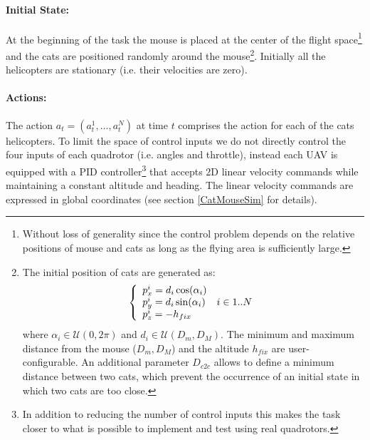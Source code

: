 \documentclass[a4paper,11pt]{report}
\begin{document}
\paragraph{Initial State:} At the beginning of the task the mouse is placed at the center of the flight space\footnote{Without loss of generality since the control problem depends on the relative positions of mouse and cats as long as the flying area is sufficiently large.} and the cats are positioned randomly around the mouse\footnote{
The initial position of cats are generated as:
$$
\left\{
\begin{array}{l l}
p^i_x =  d_i \cos(\alpha_i) & \\
p^i_y =  d_i \sin(\alpha_i) & i \in 1..N\\
p^i_z = - h_{fix} & \\
\end{array}
\right.
$$
where $\alpha_i \in \mathcal{U}(0,2\pi)$ and $d_i \in \mathcal{U}(D_m,D_M)$. The minimum and maximum distance from the mouse ($D_m,D_M$) and the altitude $h_{fix}$ are user-configurable.
An additional parameter $D_{c2c}$ allows to define a minimum distance between two cats, which prevent the occurrence of an initial state in which two cats are too close.
}.
Initially all the helicopters are stationary (i.e. their velocities are zero).

\paragraph{Actions:} 
The action $a_t = (a^1_t,...,a^{N}_t)$ at time $t$ comprises the action for each of the cats helicopters. 
To limit the space of control inputs we do not directly control the four inputs of each quadrotor (i.e. angles and throttle), instead each UAV is equipped with a PID controller\footnote{In addition to reducing the number of control inputs this makes the task closer to what is possible to implement and test using real quadrotors.} that accepts 2D linear velocity commands while maintaining a constant altitude and heading. The linear velocity commands are expressed in global coordinates (see section \ref{CatMouseSim} for details).
\end{document}
